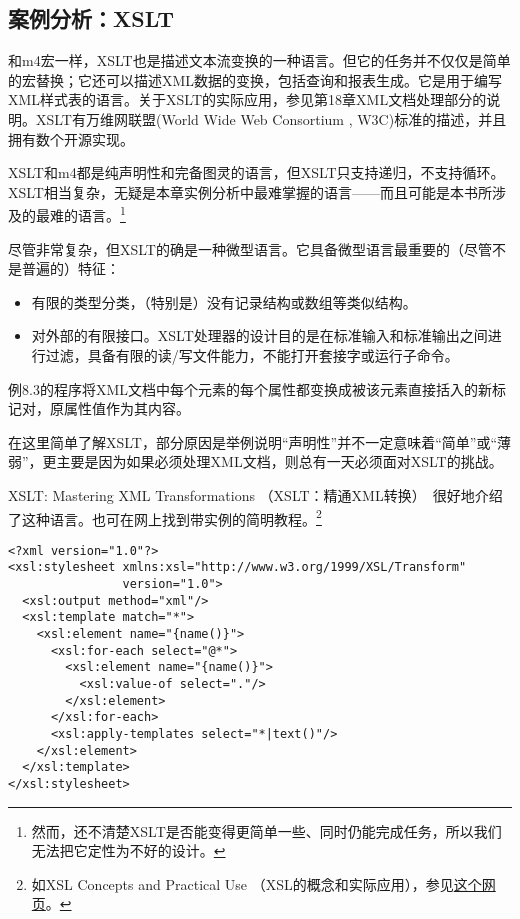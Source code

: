 \documentclass[12pt,oneside]{ctexbook}
\begin{document}
\begin{common-format}
\subsection{案例分析：XSLT}
和m4宏一样，XSLT也是描述文本流变换的一种语言。但它的任务并不仅仅是简单的宏替换；它还可以描述XML数据的变换，包括查询和报表生成。它是用于编写XML样式表的语言。关于XSLT的实际应用，参见第18章XML文档处理部分的说明。XSLT有万维网联盟(World Wide Web Consortium , W3C)标准的描述，并且拥有数个开源实现。

XSLT和m4都是纯声明性和完备图灵的语言，但XSLT只支持递归，不支持循环。XSLT相当复杂，无疑是本章实例分析中最难掌握的语言——而且可能是本书所涉及的最难的语言。\footnote{然而，还不清楚XSLT是否能变得更简单一些、同时仍能完成任务，所以我们无法把它定性为不好的设计。}

尽管非常复杂，但XSLT的确是一种微型语言。它具备微型语言最重要的（尽管不是普遍的）特征：
\begin{itemize}
\item 有限的类型分类，（特别是）没有记录结构或数组等类似结构。
\item 对外部的有限接口。XSLT处理器的设计目的是在标准输入和标准输出之间进行过滤，具备有限的读/写文件能力，不能打开套接字或运行子命令。
\end{itemize}

例8.3的程序将XML文档中每个元素的每个属性都变换成被该元素直接括入的新标记对，原属性值作为其内容。

在这里简单了解XSLT，部分原因是举例说明“声明性”并不一定意味着“简单”或“薄弱”，更主要是因为如果必须处理XML文档，则总有一天必须面对XSLT的挑战。

XSLT: Mastering XML Transformations （XSLT：精通XML转换）~\cite{Tidwell}很好地介绍了这种语言。也可在网上找到带实例的简明教程。\footnote{如XSL Concepts and Practical Use （XSL的概念和实际应用），参见\href{http://nwalsh.com/docs/tutorials/xsl/xsl/slides.html}{这个网页}。}


\begin{Verbatim}[label=例 8.3 XSLT程序实例]
<?xml version="1.0"?>
<xsl:stylesheet xmlns:xsl="http://www.w3.org/1999/XSL/Transform"
                version="1.0">
  <xsl:output method="xml"/>
  <xsl:template match="*">
    <xsl:element name="{name()}">
      <xsl:for-each select="@*">
        <xsl:element name="{name()}">
          <xsl:value-of select="."/>
        </xsl:element>
      </xsl:for-each>
      <xsl:apply-templates select="*|text()"/>
    </xsl:element>
  </xsl:template>
</xsl:stylesheet>
\end{Verbatim}



\end{common-format}
\end{document}
